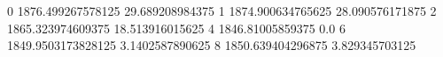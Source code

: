 0 1876.499267578125 29.689208984375
1 1874.900634765625 28.090576171875
2 1865.323974609375 18.513916015625
4 1846.81005859375 0.0
6 1849.9503173828125 3.1402587890625
8 1850.639404296875 3.829345703125
